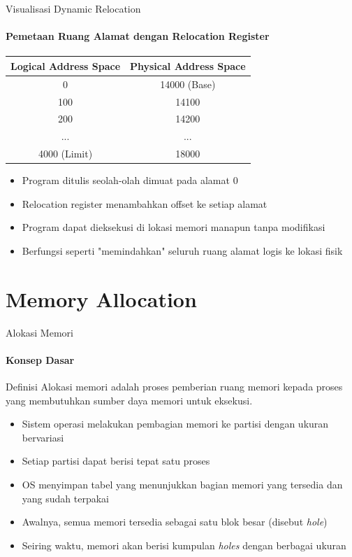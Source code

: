 \documentclass[10pt,aspectratio=169]{beamer}
\begin{document}
\begin{frame}{Visualisasi Dynamic Relocation}
    \framesubtitle{Pemetaan Ruang Alamat dengan Relocation Register}
    
    \begin{center}
        \begin{tabular}{|c|c|}
            \hline
            \textbf{Logical Address Space} & \textbf{Physical Address Space} \\
            \hline
            0 & 14000 (Base) \\
            \hline
            100 & 14100 \\
            \hline
            200 & 14200 \\
            \hline
            ... & ... \\
            \hline
            4000 (Limit) & 18000 \\
            \hline
        \end{tabular}
    \end{center}
    
    \begin{itemize}
        \item Program ditulis seolah-olah dimuat pada alamat 0
        \item Relocation register menambahkan offset ke setiap alamat
        \item Program dapat dieksekusi di lokasi memori manapun tanpa modifikasi
        \item Berfungsi seperti "memindahkan" seluruh ruang alamat logis ke lokasi fisik
    \end{itemize}
\end{frame}

\section{Memory Allocation}

\begin{frame}{Alokasi Memori}
    \framesubtitle{Konsep Dasar}
    
    \begin{block}{Definisi}
        Alokasi memori adalah proses pemberian ruang memori kepada proses yang membutuhkan sumber daya memori untuk eksekusi.
    \end{block}
    
    \begin{itemize}
        \item Sistem operasi melakukan pembagian memori ke partisi dengan ukuran bervariasi
        \item Setiap partisi dapat berisi tepat satu proses
        \item OS menyimpan tabel yang menunjukkan bagian memori yang tersedia dan yang sudah terpakai
        \item Awalnya, semua memori tersedia sebagai satu blok besar (disebut \textit{hole})
        \item Seiring waktu, memori akan berisi kumpulan \textit{holes} dengan berbagai ukuran
    \end{itemize}
\end{frame}
\end{document}
